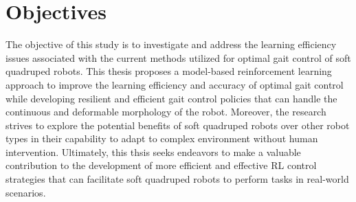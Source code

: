 \section{Objectives} 
The objective of this study is to investigate and address the learning efficiency issues associated with the current methods utilized for optimal gait control of soft quadruped robots. This thesis proposes a model-based reinforcement learning approach to improve the learning efficiency and accuracy of optimal gait control while developing resilient and efficient gait control policies that can handle the continuous and deformable morphology of the robot. Moreover, the research strives to explore the potential benefits of soft quadruped robots over other robot types in their capability to adapt to complex environment without human intervention. Ultimately, this thsis seeks endeavors to make a valuable contribution to the development of more efficient and effective RL control strategies that can facilitate soft quadruped robots to perform tasks in real-world scenarios.

